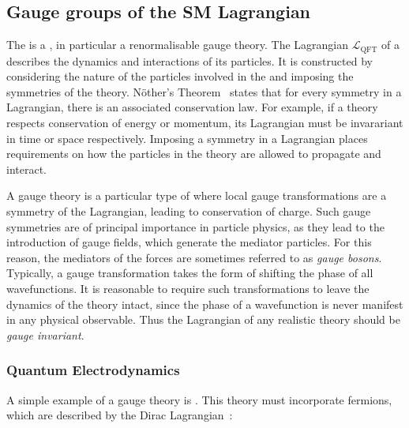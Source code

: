\subsection{Gauge groups of the SM Lagrangian}
\label{sec:th:gauge}

The \SM is a \QFT, in particular a renormalisable gauge theory. 
The Lagrangian $\mathcal{L}_{\text{QFT}}$ of a \QFT describes the dynamics and interactions of its particles. %
It is constructed by considering the nature of the particles involved in the \QFT and imposing the symmetries of the theory.
N\"other's Theorem~\cite{Noether} states that for every symmetry in a Lagrangian, there is an associated conservation law. 
For example, if a theory respects conservation of energy or momentum, its Lagrangian must be invarariant in time or space respectively. Imposing a symmetry in a Lagrangian places requirements on how the particles in the theory are allowed to propagate and interact. 

A gauge theory is a particular type of \QFT where local gauge transformations are a symmetry of the Lagrangian, leading to conservation of charge. Such gauge symmetries are of principal importance in particle physics, as they lead to the introduction of gauge fields, which generate the mediator particles. For this reason, the mediators of the forces are sometimes referred to as \emph{gauge bosons}. 
Typically, a gauge transformation takes the form of shifting the phase of all wavefunctions. It is reasonable to require such transformations to leave the dynamics of the theory intact, since the phase of a wavefunction is never manifest in any physical observable. Thus the Lagrangian of any realistic theory should be \emph{gauge invariant}.

\subsubsection{Quantum Electrodynamics}
\label{sec:th:qed}
A simple example of a gauge theory is \QED. 
This theory must incorporate fermions, which are described by the Dirac Lagrangian~\cite{griffiths2008introduction}:

